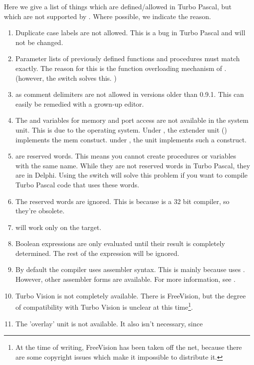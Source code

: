 \documentclass{book}
\begin{document}
Here we give a list of things which are defined/allowed in Turbo Pascal, but
which are not supported by \fpc. Where possible, we indicate the reason.
\begin{enumerate}
\item Duplicate case labels are not allowed. This is a bug in Turbo Pascal
and will not be changed.
\item Parameter lists of previously defined functions and procedures must
match exactly. The reason for this is the function overloading mechanism of
\fpc. (however, the  switch solves this. )
\item {} as comment delimiters are not allowed in versions
older than 0.9.1. This can easily be remedied with a grown-up editor.
\item The  and  variables for memory and port
access are not available in the system unit. This is due to the operating system. Under
\dos, the extender unit () implements the mem constuct.
under \linux, the  unit implements such a construct.
\item {}
are reserved words. This means you cannot create procedures or variables
with the same name. While they are not reserved words in Turbo Pascal,
they are in Delphi. Using the  switch will solve this problem if
you want to compile Turbo Pascal code that uses these words.
\item The reserved words  are ignored. This is
because \fpc is a 32 bit compiler, so they're obsolete.
\item {} will work only on the \dos target.
\item Boolean expressions are only evaluated until their result is completely
determined. The rest of the expression will be ignored.
\item By default the compiler uses   assembler syntax.
This is mainly because \fpc uses \gnu {}. However, other assembler
forms are available. For more information, see \progref.
\item Turbo Vision is not completely available. There is FreeVision, but the
degree of compatibility with Turbo Vision is unclear at this
time\footnote{At the time of writing, FreeVision has been taken off the
net, because there are some copyright issues which make it impossible to
distribute it.}.
\item The 'overlay' unit is not available. It also isn't necessary, since

\end{enumerate}
\end{document}
